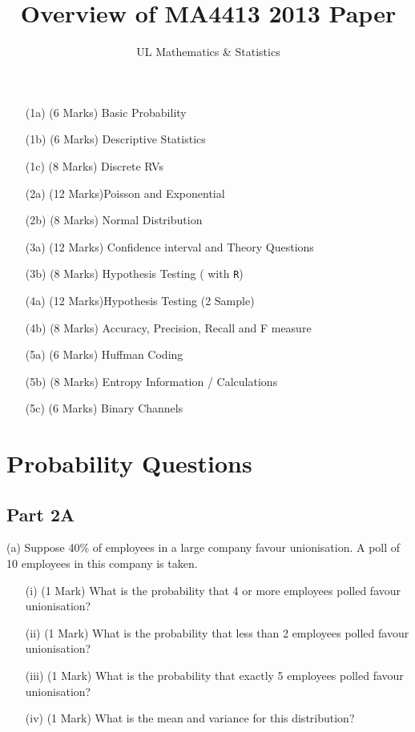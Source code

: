 \documentclass[]{article}
\title{Overview of MA4413 2013 Paper}
\author{UL Mathematics \& Statistics}
\begin{document}
\maketitle

\begin{itemize}
\item[(1a)] (6 Marks) Basic Probability
\item[(1b)] (6 Marks) Descriptive Statistics
\item[(1c)] (8 Marks) Discrete RVs
\item[(2a)] (12 Marks)Poisson and Exponential
\item[(2b)] (8 Marks) Normal Distribution
\item[(3a)] (12 Marks) Confidence interval and Theory Questions
\item[(3b)] (8 Marks) Hypothesis Testing ( with \texttt{R})
\item[(4a)] (12 Marks)Hypothesis Testing (2 Sample)
\item[(4b)] (8 Marks) Accuracy, Precision, Recall and F measure
\item[(5a)] (6 Marks) Huffman Coding
\item[(5b)] (8 Marks) Entropy Information / Calculations
\item[(5c)] (6 Marks) Binary Channels
\end{itemize}

\newpage
\section{Probability Questions}
\subsection*{Part 2A}

(a)	Suppose 40\% of employees in a large company favour unionisation.  A poll of 10 employees in this company is taken.  
 \begin{itemize}
\item[(i)] (1 Mark) 	What is the probability that 4 or more employees polled favour unionisation? 
\item[(ii)] (1 Mark) 	What is the probability that less than 2 employees polled favour unionisation?
\item[(iii)] (1 Mark) 	What is the probability that exactly 5 employees polled favour unionisation?
\item[(iv)] (1 Mark) 	What is the mean and variance for this distribution?
\end{itemize}										       
\end{document}
